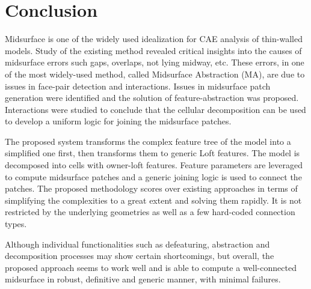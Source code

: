 \section{Conclusion}

Midsurface is one of the widely used idealization for CAE analysis of thin-walled models. Study of the existing method revealed critical insights into the causes of midsurface errors such gaps, overlaps, not lying midway, etc. These errors, in one of the most widely-used method, called Midsurface Abstraction (MA), are due to issues in face-pair detection and interactions. Issues in  midsurface patch generation were identified and the solution of feature-abstraction was proposed. Interactions were studied to conclude that the cellular decomposition can be used to develop a uniform logic for joining the midsurface patches. 

The proposed system transforms the complex feature tree of the model into a simplified one first, then  transforms them to generic Loft features. The model is decomposed into cells with owner-loft features. Feature parameters are leveraged to compute midsurface patches and a generic joining logic is used to connect the patches. The proposed methodology scores over existing approaches \cite{Chong2004, Cao2009,Cao2011,Woo2013,Boussuge2013,Boussuge2013a, Boussuge2014,Zhu2015} in terms of simplifying the complexities to a great extent and solving them rapidly.   It is not restricted by the underlying geometries as well as a few hard-coded connection types.


Although individual functionalities such as defeaturing, abstraction and decomposition processes may show certain shortcomings, but overall, the proposed approach seems to work well and is able to compute a well-connected midsurface in robust, definitive and generic manner, with minimal failures.

